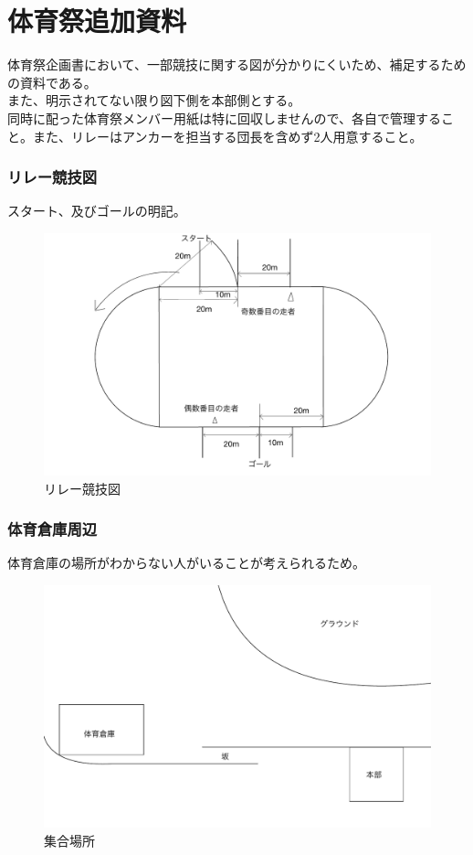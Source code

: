\documentclass[titlepage]{jarticle}
\begin{document}
 \part*{体育祭追加資料}
 体育祭企画書において、一部競技に関する図が分かりにくいため、補足するための資料である。\\
 また、明示されてない限り図下側を本部側とする。\\
同時に配った体育祭メンバー用紙は特に回収しませんので、各自で管理すること。また、リレーはアンカーを担当する団長を含めず2人用意すること。
 \section{リレー競技図}
  スタート、及びゴールの明記。
   \begin{figure}[H]
    \centering
    \includegraphics[width=12cm]{rire3.pdf}
    \caption{リレー競技図}
   \end{figure}
 \section{体育倉庫周辺}
  体育倉庫の場所がわからない人がいることが考えられるため。
 \begin{figure}[H]
    \centering
    \includegraphics[width=12cm]{syugo.pdf}
    \caption{集合場所}
   \end{figure}
\end{document}
